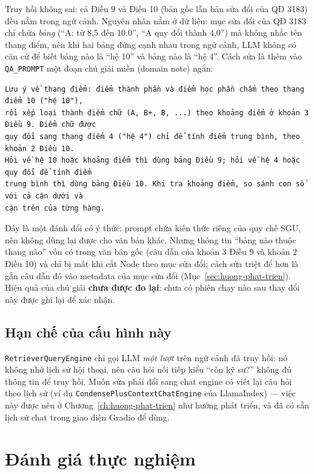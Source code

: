 Truy hồi không sai: cả Điều 9 và Điều 10 (bản gốc lẫn bản sửa đổi của QĐ 3183) đều nằm trong ngữ
cảnh. Nguyên nhân nằm ở dữ liệu: mục sửa đổi của QĐ 3183 chỉ chứa \emph{bảng} (``A: từ 8,5 đến 10.0'',
``A quy đổi thành 4,0'') mà không nhắc tên thang điểm, nên khi hai bảng đứng cạnh nhau trong ngữ cảnh,
LLM không có căn cứ để biết bảng nào là ``hệ 10'' và bảng nào là ``hệ 4''. Cách sửa là thêm vào
\texttt{QA\_PROMPT} một đoạn chú giải miền (domain note) ngắn:

\begin{lstlisting}[caption={Chú giải thang điểm thêm vào \texttt{QA\_PROMPT} (\texttt{src/query\_engine.py}).}, label={lst:chu-giai-thang-diem}]
Lưu ý về thang điểm: điểm thành phần và điểm học phần chấm theo thang điểm 10 ("hệ 10"),
rồi xếp loại thành điểm chữ (A, B+, B, ...) theo khoảng điểm ở khoản 3 Điều 9. Điểm chữ được
quy đổi sang thang điểm 4 ("hệ 4") chỉ để tính điểm trung bình, theo khoản 2 Điều 10.
Hỏi về hệ 10 hoặc khoảng điểm thì dùng bảng Điều 9; hỏi về hệ 4 hoặc quy đổi để tính điểm
trung bình thì dùng bảng Điều 10. Khi tra khoảng điểm, so sánh con số với cả cận dưới và
cận trên của từng hàng.
\end{lstlisting}

Đây là một đánh đổi có ý thức: prompt chứa kiến thức riêng của quy chế SGU, nên không dùng lại được
cho văn bản khác. Nhưng thông tin ``bảng nào thuộc thang nào'' vốn có trong văn bản gốc (câu dẫn của
khoản 3 Điều 9 và khoản 2 Điều 10) và chỉ bị mất khi cắt Node theo mục sửa đổi; cách sửa triệt để hơn
là gắn câu dẫn đó vào metadata của mục sửa đổi (Mục~\ref{sec:huong-phat-trien}). Hiệu quả của chú giải
\textbf{chưa được đo lại}: chưa có phiên chạy nào sau thay đổi này được ghi lại để xác nhận.

\subsection{Hạn chế của cấu hình này}

\texttt{RetrieverQueryEngine} chỉ gọi LLM \emph{một lượt} trên ngữ cảnh đã truy hồi: nó không nhớ
lịch sử hội thoại, nên câu hỏi nối tiếp kiểu ``còn kỹ sư?'' không đủ thông tin để truy hồi. Muốn
sửa phải đổi sang chat engine có viết lại câu hỏi theo lịch sử (ví dụ
\texttt{CondensePlusContextChatEngine} của LlamaIndex) --- việc này được nêu ở Chương~\ref{ch:huong-phat-trien}
như hướng phát triển, và đã có sẵn lịch sử chat trong giao diện Gradio để dùng.

\section{Đánh giá thực nghiệm}
\label{sec:danh-gia-thuc-nghiem}

